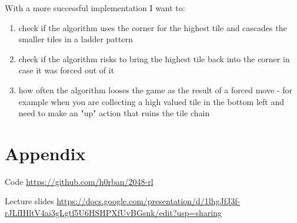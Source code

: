 \documentclass[letterpaper]{article} %
\begin{document}
With a more successful implementation I want to:
\begin{enumerate}
    \item check if the algorithm uses the corner for the highest tile and cascades the smaller tiles in a ladder pattern
    \item check if the algorithm risks to bring the highest tile back into the corner in case it was forced out of it
    \item how often the algorithm looses the game as the result of a forced move - for example when you are collecting a high valued tile in the bottom left and need to make an "up" action that ruins the tile chain
\end{enumerate}




\section{Appendix}

Code \href{https://github.com/h0rban/2048-rl}{https://github.com/h0rban/2048-rl}

\noindent
Lecture slides \href{https://docs.google.com/presentation/d/1lhgJfJ3f-rJLfIHltV4ai3gLgtf5U6HSHPXfUvBGsnk/edit?usp=sharing}{https://docs.google.com/presentation/d/1lhgJfJ3f-rJLfIHltV4ai3gLgtf5U6HSHPXfUvBGsnk/edit?usp=sharing}
\end{document}
